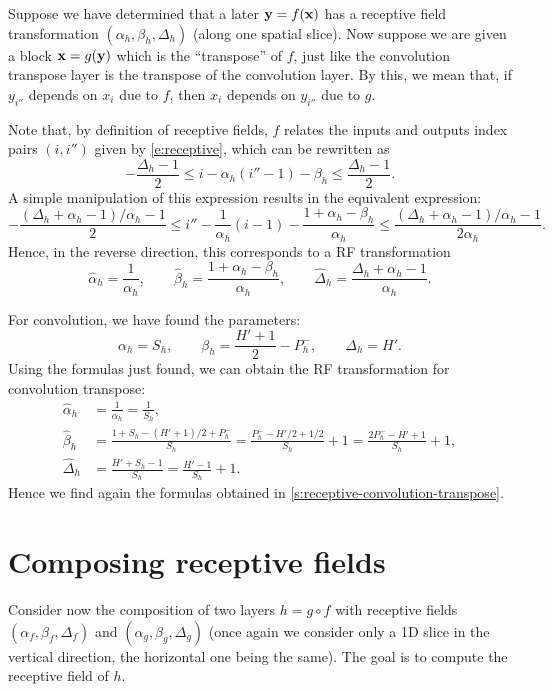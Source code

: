 Suppose we have determined that a later $\mathbf{y} = f(\mathbf{x})$ has a receptive field transformation $(\alpha_h,\beta_h,\Delta_h)$ (along one spatial slice). Now suppose we are given a block $\mathbf{x} = g(\mathbf{y})$ which is the ``transpose'' of $f$, just like the convolution transpose layer is the transpose of the convolution layer. By this, we mean that, if $y_{i''}$ depends on $x_{i}$ due to $f$, then $x_{i}$ depends on $y_{i''}$ due to $g$.

Note that, by definition of receptive fields, $f$ relates the  inputs and outputs index pairs $(i,i'')$ given by \eqref{e:receptive}, which can be rewritten as
\[
- \frac{\Delta_h-1}{2} \leq  i - \alpha_h (i'' -1) - \beta_h \leq\frac{\Delta_h-1}{2}.
\]
A simple manipulation of this expression results in the equivalent expression:
\[
- \frac{(\Delta_h + \alpha_h - 1)/\alpha_h-1}{2} \leq  i'' - \frac{1}{\alpha_h} (i - 1) - \frac{1 + \alpha_h - \beta_h }{\alpha_h} \leq\frac{(\Delta_h + \alpha_h - 1)/\alpha_h-1}{2\alpha_h}.
\]
Hence, in the reverse direction, this corresponds to a RF transformation
\[
\hat \alpha_h = \frac{1}{\alpha_h},
\qquad
\hat \beta_h = \frac{1 + \alpha_h - \beta_h}{\alpha_h},
\qquad
\hat \Delta_h = \frac{\Delta_h + \alpha_h -1}{\alpha_h}.
\]

\begin{example}
For convolution, we have found the parameters:
\[
\alpha_h = S_h,
\qquad
\beta_h = \frac{H'+1}{2} - P_h^-,
\qquad
\Delta_h = H'.
\]
Using the formulas just found, we can obtain the RF transformation for convolution transpose:
\begin{align*}
\hat \alpha_h &= \frac{1}{\alpha_h} = \frac{1}{S_h},
\\
\hat \beta_h &= \frac{1 + S_h - (H'+1)/2 + P_h^-}{S_h}
= \frac{P_h^- -H'/2 +1/2}{S_h} + 1
= \frac{2P_h^- -H' + 1}{S_h} + 1,
\\
\hat \Delta_h &= \frac{H' + S_h - 1}{S_h} = \frac{H' -1}{S_h} + 1.
\end{align*}
Hence we find again the formulas obtained in \cref{s:receptive-convolution-transpose}.
\end{example}


\section{Composing receptive fields}\label{s:receptive-composing}

Consider now the composition of two layers $h = g \circ f$ with receptive fields $(\alpha_f, \beta_f, \Delta_f)$ and $(\alpha_g, \beta_g, \Delta_g)$ (once again we consider only a 1D slice in the vertical direction, the horizontal one being the same). The goal is to compute the receptive field of $h$.

